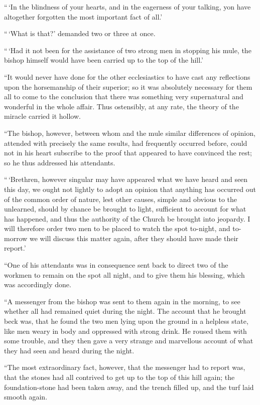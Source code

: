 \documentclass[
  12pt,
  a5paper,
  twoside]{book}
\begin{document}
``\,`In the blindness of your hearts, and in the eagerness of your
talking, yon have altogether forgotten the most important fact of all.'

``\,`What is that?' demanded two or three at once.

``\,`Had it not been for the assistance of two strong men in stopping
his mule, the bishop himself would have been carried up to the top of
the hill.'

``It would never have done for the other ecclesiastics to have cast any
reflections upon the horsemanship of their superior; so it was
absolutely necessary for them all to come to the conclusion that there
was something very supernatural and wonderful in the whole affair. Thus
ostensibly, at any rate, the theory of the miracle carried it hollow.

``The bishop, however, between whom and the mule similar differences of
opinion, attended with precisely the same results, had frequently
occurred before, could not in his heart subscribe to the proof that
appeared to have convinced the rest; so he thus addressed his
attendants.

``\,`Brethren, however singular may have appeared what we have heard and
seen this day, we ought not lightly to adopt an opinion that anything
has occurred out of the common order of nature, lest other causes,
simple and obvious to the unlearned, should by chance be brought to
light, sufficient to account for what has happened, and thus the
authority of the Church be brought into jeopardy. I will therefore order
two men to be placed to watch the spot to-night, and to-morrow we will
discuss this matter again, after they should have made their report.'

``One of his attendants was in consequence sent back to direct two of
the workmen to remain on the spot all night, and to give them his
blessing, which was accordingly done.

``A messenger from the bishop was sent to them again in the morning, to
see whether all had remained quiet during the night. The account that he
brought beck was, that he found the two men lying upon the ground in a
helpless state, like men weary in body and oppressed with strong drink.
He roused them with some trouble, and they then gave a very strange and
marvellous account of what they had seen and heard during the night.

``The most extraordinary fact, however, that the messenger had to report
was, that the stones had all contrived to get up to the top of this hill
again; the foundation-stone had been taken away, and the trench filled
up, and the turf laid smooth again.
\end{document}
